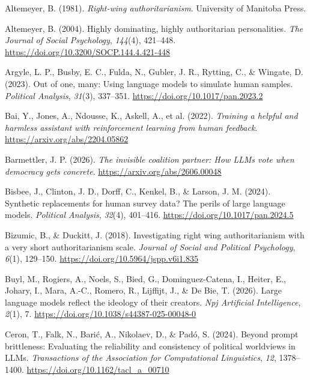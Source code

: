 \documentclass[
]{article}
\newlength{\cslhangindent}
\newenvironment{CSLReferences}[2] %
 {\begin{list}{}{%
  \setlength{\itemindent}{0pt}
  \setlength{\leftmargin}{0pt}
  \setlength{\parsep}{0pt}
  \ifodd #1
   \setlength{\leftmargin}{\cslhangindent}
   \setlength{\itemindent}{-1\cslhangindent}
  \fi
  \setlength{\itemsep}{#2\baselineskip}}}
 {\end{list}}
\begin{document}
\protect{}\label{refs}
\begin{CSLReferences}{1}{0}
Altemeyer, B. (1981). \emph{Right-wing authoritarianism}. University of
Manitoba Press.

Altemeyer, B. (2004). Highly dominating, highly authoritarian
personalities. \emph{The Journal of Social Psychology}, \emph{144}(4),
421--448. \url{https://doi.org/10.3200/SOCP.144.4.421-448}

Argyle, L. P., Busby, E. C., Fulda, N., Gubler, J. R., Rytting, C., \&
Wingate, D. (2023). Out of one, many: Using language models to simulate
human samples. \emph{Political Analysis}, \emph{31}(3), 337--351.
\url{https://doi.org/10.1017/pan.2023.2}

{Bai, Y., Jones, A., Ndousse, K., Askell, A., et al.} (2022).
\emph{Training a helpful and harmless assistant with reinforcement
learning from human feedback}. \url{https://arxiv.org/abs/2204.05862}

Barmettler, J. P. (2026). \emph{The invisible coalition partner: How
{LLMs} vote when democracy gets concrete}.
\url{https://arxiv.org/abs/2606.00048}

Bisbee, J., Clinton, J. D., Dorff, C., Kenkel, B., \& Larson, J. M.
(2024). Synthetic replacements for human survey data? {The} perils of
large language models. \emph{Political Analysis}, \emph{32}(4),
401--416. \url{https://doi.org/10.1017/pan.2024.5}

Bizumic, B., \& Duckitt, J. (2018). Investigating right wing
authoritarianism with a very short authoritarianism scale. \emph{Journal
of Social and Political Psychology}, \emph{6}(1), 129--150.
\url{https://doi.org/10.5964/jspp.v6i1.835}

Buyl, M., Rogiers, A., Noels, S., Bied, G., Dominguez-Catena, I.,
Heiter, E., Johary, I., Mara, A.-C., Romero, R., Lijffijt, J., \& De
Bie, T. (2026). Large language models reflect the ideology of their
creators. \emph{Npj Artificial Intelligence}, \emph{2}(1), 7.
\url{https://doi.org/10.1038/s44387-025-00048-0}

Ceron, T., Falk, N., Barić, A., Nikolaev, D., \& Padó, S. (2024). Beyond
prompt brittleness: Evaluating the reliability and consistency of
political worldviews in {LLMs}. \emph{Transactions of the Association
for Computational Linguistics}, \emph{12}, 1378--1400.
\url{https://doi.org/10.1162/tacl_a_00710}


\end{CSLReferences}
\end{document}
